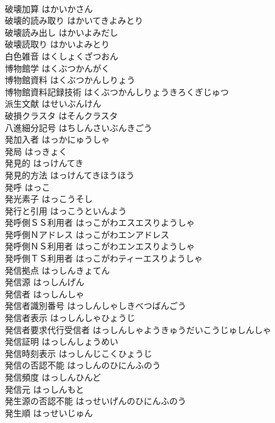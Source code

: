 \documentclass[8pt]{extreport}
\begin{document}
\begin{CJK}{UTF8}{min}
\\	破壊加算	はかいかさん	
\\	破壊的読み取り	はかいてきよみとり	
\\	破壊読み出し	はかいよみだし	
\\	破壊読取り	はかいよみとり	
\\	白色雑音	はくしょくざつおん	
\\	博物館学	はくぶつかんがく	
\\	博物館資料	はくぶつかんしりょう	
\\	博物館資料記録技術	はくぶつかんしりょうきろくぎじゅつ	
\\	派生文献	はせいぶんけん	
\\	破損クラスタ	はそんクラスタ	
\\	八進細分記号	はちしんさいぶんきごう	
\\	発加入者	はっかにゅうしゃ	
\\	発局	はっきょく	
\\	発見的	はっけんてき	
\\	発見的方法	はっけんてきほうほう	
\\	発呼	はっこ	
\\	発光素子	はっこうそし	
\\	発行と引用	はっこうといんよう	
\\	発呼側ＳＳ利用者	はっこがわエスエスりようしゃ	
\\	発呼側Ｎアドレス	はっこがわエンアドレス	
\\	発呼側ＮＳ利用者	はっこがわエンエスりようしゃ	
\\	発呼側ＴＳ利用者	はっこがわティーエスりようしゃ	
\\	発信拠点	はっしんきょてん	
\\	発信源	はっしんげん	
\\	発信者	はっしんしゃ	
\\	発信者識別番号	はっしんしゃしきべつばんごう	
\\	発信者表示	はっしんしゃひょうじ	
\\	発信者要求代行受信者	はっしんしゃようきゅうだいこうじゅしんしゃ	
\\	発信証明	はっしんしょうめい	
\\	発信時刻表示	はっしんじこくひょうじ	
\\	発信の否認不能	はっしんのひにんふのう	
\\	発信頻度	はっしんひんど	
\\	発信元	はっしんもと	
\\	発生源の否認不能	はっせいげんのひにんふのう	
\\	発生順	はっせいじゅん	

\end{CJK}
\end{document}
